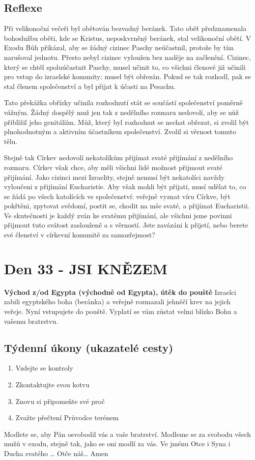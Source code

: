 \documentclass[11pt]{article}
\newcommand{\zacatekPatyTyden}{
  \textbf{Východ z/od Egypta (východně od Egypta), útěk do pouště} \newline
  Izraelci zabili egyptského boha (beránka) a veřejně rozmazali jehněčí krev na jejich veřeje. Nyní vstupujete
  do pouště. Vyplatí se vám zůstat velmi blízko Bohu a vašemu bratrstvu.

\subsection*{Týdenní úkony (ukazatelé cesty)}
\begin{enumerate}
  \item Vzdejte se kontroly
  \item Zkontaktujte svou kotvu
  \item Znovu si připomeňte své proč
  \item Zvažte přečtení Průvodce terénem
\end{enumerate}
Modlete se, aby Pán osvobodil vás a vaše bratrství. \newline
Modleme se za svobodu všech mužů v exodu, stejně tak, jako se oni modlí za vás.\newline
Ve jménu Otce i Syna i Ducha svatého …  Otče náš… Amen
}
\begin{document}
\subsection*{Reflexe}
Při velikonoční večeři byl obětován bezvadný beránek. Tato oběť předznamenala bohoslužbu oběti, kde se Kristus,
neposkvrněný beránek, stal velikonoční obětí. V Exodu Bůh přikázal, aby se žádný cizinec Paschy neúčastnil, protože
by tím narušoval jednotu. Přesto nebyl cizinec vyloužen bez naděje na začlenění. Cizinec, který se chtěl spoluúčastnit
Paschy, musel učinit to, co všichni členové již učinili pro vstup do izraelské komunity: musel být obřezán. Pokud se tak
rozhodl, pak se stal členem společenství a byl přijat k účasti na Pesachu.

Tato překážka obřízky učinila rozhodnutí stát se součástí společenství poměrně vážným. Žádný dospělý muž jen tak z
nedělního rozmaru nedovolí, aby se nůž přiblížil jeho genitáliím. Můž, který byl rozhodnut se nechat obřezat, si zvolil
být plnohodnotným a aktivním účastníkem společenství. Zvolil si věrnost tomuto tělu.

Stejně tak Církev nedovolí nekatolíkům přijímat svaté přijímání z nedělního rozmaru. Církev však chce, aby měli
všichni lidé možnost přijmout svaté přijímání. Jako cizinci mezi Izraelity, stejně nemusí být nekatolíci navždy
vyloučeni z přijímání Eucharistie. Aby však mohli být přijati, musí udělat to, co se žádá po všech katolících ve
společenství: veřejně vyznat víru Církve, být pokřtěni, zpytovat svědomí, postit se, chodit na mše svaté, a přijímat
Eucharistii. Ve skutečnosti je každý zván ke svatému přijímání, ale všichni jsme povinni přijmout tuto svátost
zaslouženě a s věrností. Jste zavázáni k přijetí, nebo berete své členství v církevní komunitě za samozřejmost?

\newpage
\section{Den 33 - JSI KNĚZEM}
\zacatekPatyTyden
\end{document}
